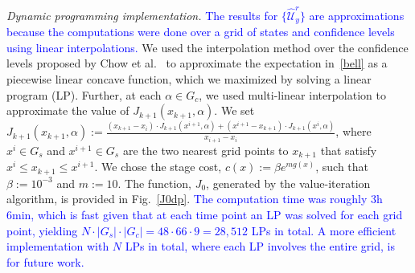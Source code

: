 \documentclass[letterpaper, 10 pt, conference]{ieeeconf}  %
\begin{document}
\textit{Dynamic programming implementation.}
\textcolor{blue}{The results for $\{\widehat{\mathcal{U}}_y^r\}$ are approximations because the computations were done 
over a grid of states and confidence levels using linear interpolations.}
We used the interpolation method over the confidence levels proposed by Chow et al.~\cite{chow2015risk} 
to approximate the expectation in~\eqref{bell} as a piecewise linear concave function, which we maximized by solving a linear program (LP).
Further, at each $\alpha \in G_c$, we used multi-linear interpolation to approximate the value of $J_{k+1}(x_{k+1}, \alpha)$.
We set $J_{k+1}(x_{k+1}, \alpha) := \frac{(x_{k+1} - x_i) \cdot J_{k+1}(x^{i+1}, \alpha) + (x^{i+1} - x_{k+1})  \cdot J_{k+1}(x^i, \alpha)}{x_{i+1}-x_i}$,
where $x^i \in G_s$ and $x^{i+1} \in G_s$ are the two nearest grid points to $x_{k+1}$ that satisfy $x^i \leq x_{k+1} \leq x^{i+1}$.
We chose the stage cost, $c(x) := \beta e^{m g(x)}$, such that $\beta := 10^{-3}$ and $m := 10$.
The function, $J_0$, generated by the value-iteration algorithm, is provided in Fig.~\ref{J0dp}.
\textcolor{blue}{The computation time was roughly 3h 6min, 
which is fast given that at each time point an LP was solved for each grid point, yielding $N\cdot|G_s|\cdot|G_c| = 48\cdot66\cdot9 = 28,512$ LPs in total.
A more efficient implementation with $N$ LPs in total, where each LP involves the entire grid, is for future work.}
\end{document}
